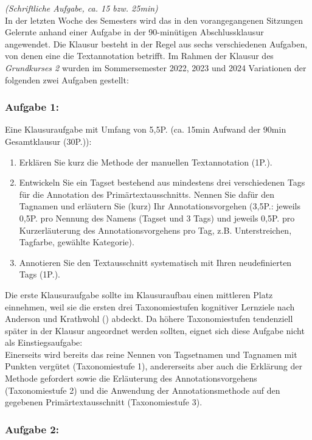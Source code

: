 \documentclass[
          a4paper,
        ]{article}
\providecommand{\tightlist}{%
  \setlength{\itemsep}{0pt}\setlength{\parskip}{0pt}}
\begin{document}
\emph{(Schriftliche Aufgabe, ca. 15 bzw. 25min)}\\
In der letzten Woche des Semesters wird das in den vorangegangenen
Sitzungen Gelernte anhand einer Aufgabe in der 90-minütigen
Abschlussklausur angewendet. Die Klausur besteht in der Regel aus sechs
verschiedenen Aufgaben, von denen eine die Textannotation betrifft. Im
Rahmen der Klausur des \emph{Grundkurses 2} wurden im Sommersemester
2022, 2023 und 2024 Variationen der folgenden zwei Aufgaben gestellt:

\subsubsection{Aufgabe 1:}\label{aufgabe-1}

Eine Klausuraufgabe mit Umfang von 5,5P. (ca. 15min Aufwand der 90min
Gesamtklausur (30P.)):

\begin{enumerate}
\def\labelenumi{\alph{enumi})}
\tightlist
\item
  Erklären Sie kurz die Methode der manuellen Textannotation (1P.).
\item
  Entwickeln Sie ein Tagset bestehend aus mindestens drei verschiedenen
  Tags für die Annotation des Primärtextausschnitts. Nennen Sie dafür
  den Tagnamen und erläutern Sie (kurz) Ihr Annotationsvorgehen (3,5P.:
  jeweils 0,5P. pro Nennung des Namens (Tagset und 3 Tags) und jeweils
  0,5P. pro Kurzerläuterung des Annotationsvorgehens pro Tag, z.B.
  Unterstreichen, Tagfarbe, gewählte Kategorie).
\item
  Annotieren Sie den Textausschnitt systematisch mit Ihren
  neudefinierten Tags (1P.).
\end{enumerate}

Die erste Klausuraufgabe sollte im Klausuraufbau einen mittleren Platz
einnehmen, weil sie die ersten drei Taxonomiestufen kognitiver Lernziele
nach Anderson und Krathwohl
() abdeckt. Da höhere
Taxonomiestufen tendenziell später in der Klausur angeordnet werden
sollten, eignet sich diese Aufgabe nicht als Einstiegsaufgabe:\\
Einerseits wird bereits das reine Nennen von Tagsetnamen und Tagnamen
mit Punkten vergütet (Taxonomiestufe 1), andererseits aber auch die
Erklärung der Methode gefordert sowie die Erläuterung des
Annotationsvorgehens (Taxonomiestufe 2) und die Anwendung der
Annotationsmethode auf den gegebenen Primärtextausschnitt
(Taxonomiestufe 3).

\subsubsection{Aufgabe 2:}\label{aufgabe-2}
\end{document}
